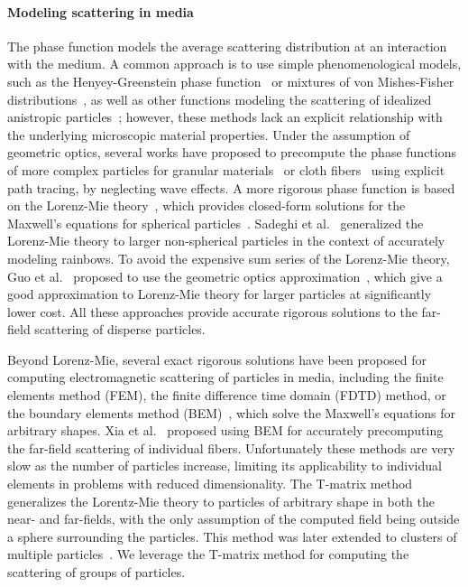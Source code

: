 \paragraph{Modeling scattering in media}
%
The phase function models the average scattering distribution at an interaction with the medium. A common approach is to use simple phenomenological models, such as the Henyey-Greenstein phase function~\cite{henyey1941diffuse} or mixtures of von Mishes-Fisher distributions~\cite{gkioulekas2013understanding}, as well as other functions modeling the scattering of idealized anistropic particles~\cite{zhao2011building,heitz2015sggx}; however, these methods lack an explicit relationship with the underlying microscopic material properties. Under the assumption of geometric optics, several works have proposed to precompute the phase functions of more complex particles for granular materials~\cite{meng2015multi,muller2016efficient} or cloth fibers~\cite{aliaga2017appearance} using explicit path tracing, by neglecting wave effects. 
%
A more rigorous phase function is based on the Lorenz-Mie theory~\cite{hulst1981light}, which provides closed-form solutions for the Maxwell's equations for spherical particles~\cite{jackel1997modeling,frisvad2007computing}. Sadeghi et al.~ generalized the Lorenz-Mie theory to larger non-spherical particles in the context of accurately modeling rainbows. To avoid the expensive sum series of the Lorenz-Mie theory, Guo et al.~ proposed to use the geometric optics approximation~\cite{glantschnig1981light}, which give a good approximation to Lorenz-Mie theory for larger particles at significantly lower cost. 
%
All these approaches provide accurate rigorous solutions to the far-field scattering of disperse particles. 

Beyond Lorenz-Mie, several exact rigorous solutions have been proposed for computing  electromagnetic scattering of particles in media, including the finite elements method (FEM), the finite difference time domain (FDTD) method, or the boundary elements method (BEM)~\cite{wu1977scattering}, which solve the Maxwell's equations for arbitrary shapes. Xia et al.~ proposed using BEM for accurately precomputing the far-field scattering of individual fibers. Unfortunately these methods are very slow as the number of particles increase, limiting its applicability to individual elements in problems with reduced dimensionality. 
%
The T-matrix method~\cite{waterman1965matrix} generalizes the Lorentz-Mie theory to particles of arbitrary shape in both the near- and far-fields, with the only assumption of the computed field being outside a sphere surrounding the particles. This method was later extended to clusters of multiple particles~\cite{peterson1973t,mackowski2011multiple}. We leverage the T-matrix method for computing the scattering of groups of particles. 


